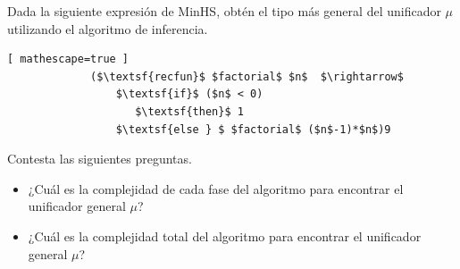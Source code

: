      \begin{exercise} Dada la siguiente expresión de \textsf{MinHS}, obtén el tipo más general del unificador $\mu$ utilizando el algoritmo de inferencia.
          \begin{lstlisting}[ mathescape=true ]
             ($\textsf{recfun}$ $factorial$ $n$  $\rightarrow$
                 $\textsf{if}$ ($n$ < 0) 
                    $\textsf{then}$ 1
                 $\textsf{else } $ $factorial$ ($n$-1)*$n$)9
           \end{lstlisting}
     \end{exercise}


   \begin{exercise} Contesta las siguientes preguntas.\\
	\begin{itemize}
	    \item ¿Cuál es la complejidad de cada fase del algoritmo para encontrar el unificador general $\mu$?\\
           \item ¿Cuál es la complejidad total del algoritmo para encontrar el unificador general $\mu$?
	\end{itemize}
   \end{exercise}

